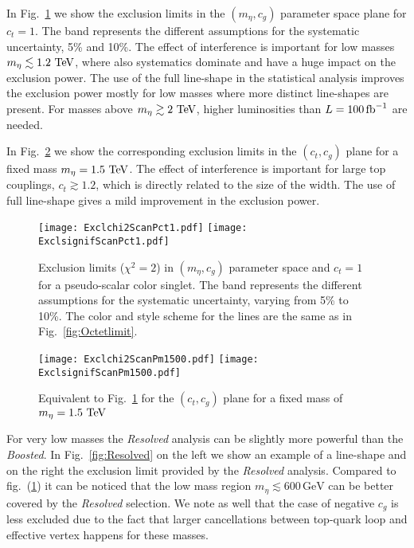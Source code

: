 \documentclass[aps,prd,amsmath,amssymb,superscriptaddress, preprintnumbers,preprint,nofootinbib,a4paper]{revtex4}
\newcommand{\GeV}{\,\text{GeV}}
\newcommand{\TeV}{\,\text{TeV}}
\newcommand{\ifb}{\,{\rm fb}^{-1}}
\def\fig#1{{fig.~(\ref{#1})}}
\begin{document}
In Fig.~\ref{fig:Exclct1} we show the exclusion limits in the $(m_\eta,c_g)$ parameter space plane  for $c_t=1$. The band represents the different assumptions for the systematic uncertainty, 5\% and 10\%. 
%
The effect of interference is important for low masses $m_\eta\lesssim 1.2\,{\rm \TeV}$, where also systematics dominate and have a huge impact on the exclusion power. The use of the full line-shape in the statistical analysis improves the exclusion power mostly for low masses where more distinct line-shapes are present. For masses above $m_\eta\gtrsim 2\,{\rm \TeV}$, higher luminosities than $L=100\ifb$ are needed.

In Fig.~\ref{fig:Exclm1500} we show the corresponding exclusion limits in the $(c_t,c_g)$ plane for a fixed mass $m_\eta=1.5\,{\rm \TeV}$. 
%
The effect of interference is important for large top couplings, $c_t\gtrsim 1.2$, which is directly related to the size of the width. The use of full line-shape gives a mild improvement in the exclusion power.

\begin{figure}[H]
\texttt{[image: Exclchi2ScanPct1.pdf]}  
\texttt{[image: ExclsignifScanPct1.pdf]} 
\caption{Exclusion limits ($\chi^2=2$) in $(m_\eta,c_g)$ parameter space and $c_t=1$ for a pseudo-scalar color singlet. The band represents the different assumptions for the systematic uncertainty, varying from 5\% to 10\%. The color and style scheme for the lines are the same as in Fig.~\ref{fig:Octetlimit}. }
\label{fig:Exclct1}
\end{figure}

\begin{figure}[H]
\texttt{[image: Exclchi2ScanPm1500.pdf]}  
\texttt{[image: ExclsignifScanPm1500.pdf]} 
\caption{Equivalent to Fig.~\ref{fig:Exclct1} for the $(c_t,c_g)$ plane for a fixed mass of $m_\eta=1.5\,{\rm \TeV}$ }
\label{fig:Exclm1500}
\end{figure}



For very low masses the \emph{Resolved} analysis can be slightly more powerful than the \emph{Boosted}.
In Fig.~\ref{fig:Resolved} on the left we show an example of a line-shape and on the right the exclusion limit
provided by the \emph{Resolved} analysis.
Compared to \fig{fig:Exclct1} it can be noticed that the low mass region  $m_\eta\lesssim 600\GeV$ can be better covered by the \emph{Resolved} selection. We note as well that the case of negative $c_g$ is less excluded due to the fact that larger cancellations between top-quark loop and effective vertex happens for these masses.
\end{document}
